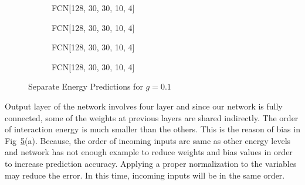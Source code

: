 \documentclass[a4paper,times,12pt]{article}
\begin{document}
\begin{figure}[H]
    \centering
    \begin{subfigure}[t]{0.45\textwidth}
		\centering
        
        \caption{FCN[128, 30, 30, 10, 4]}
		\label{fig:a}
    \end{subfigure}
    \begin{subfigure}[t]{0.45\textwidth}
		\centering
        
        \caption{FCN[128, 30, 30, 10, 4]}
		\label{fig:b}
    \end{subfigure}    
    \begin{subfigure}[t]{0.45\textwidth}
        \centering
        
        \caption{FCN[128, 30, 30, 10, 4]}
		\label{fig:c}
    \end{subfigure}
    \begin{subfigure}[t]{0.45\textwidth}
        \centering
        
        \caption{FCN[128, 30, 30, 10, 4]}
		\label{fig:c}
    \end{subfigure}
	\caption{Separate Energy Predictions for $g = 0.1$ }
\label{fig:FFN-g-0.1-S}
\end{figure}


Output layer of the network involves four layer and since our network is fully connected, some of the weights at previous layers are shared indirectly. The order of interaction energy is much smaller than the others. This is the reason of bias in Fig~\ref{fig:FFN-g-0.1-S}(a). Because, the order of incoming inputs are same as other energy levels and network has not enough example to reduce weights and bias values in order to increase prediction accuracy. Applying a proper normalization to the variables may reduce the error. In this time, incoming inputs will be in the same order.
\end{document}
